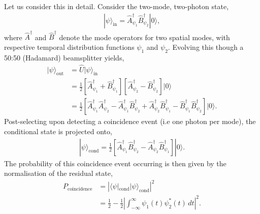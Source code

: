 \documentclass[aps,rmp,twocolumn,amsmath,amssymb,nofootinbib,superscriptaddress,longbibliography,floatfix,table-of-contents,eqsecnum]{revtex4-1}
\newcommand{\bra}[1]{\langle#1|}
\newcommand{\ket}[1]{|#1\rangle}
\begin{document}
Let us consider this in detail. Consider the two-mode, two-photon state,
\begin{align}
\ket\psi_\text{in} = \hat{A}^\dag_{\psi_1} \hat{B}^\dag_{\psi_2} \ket{0},
\end{align}
where $\hat{A}^\dag$ and $\hat{B}^\dag$ denote the mode operators for two spatial modes, with respective temporal distribution functions $\psi_1$ and $\psi_2$. Evolving this though a 50:50 (Hadamard) beamsplitter yields,
\begin{align}
\ket\psi_\text{out} &= \hat{U} \ket\psi_\text{in} \\
&= \frac{1}{2} \left[\hat{A}^\dag_{\psi_1}+\hat{B}^\dag_{\psi_1}\right]\left[\hat{A}^\dag_{\psi_2}-\hat{B}^\dag_{\psi_2}\right] \ket{0} \nonumber \\
&= \frac{1}{2} \left[\hat{A}^\dag_{\psi_1}\hat{A}^\dag_{\psi_2} - \hat{A}^\dag_{\psi_1}\hat{B}^\dag_{\psi_2} + \hat{A}^\dag_{\psi_2}\hat{B}^\dag_{\psi_1} - \hat{B}^\dag_{\psi_1}\hat{B}^\dag_{\psi_2}\right] \ket{0} \nonumber.
\end{align}
Post-selecting upon detecting a coincidence event (i.e one photon per mode), the conditional state is projected onto,
\begin{align}
\ket\psi_\text{cond} = \frac{1}{2} \left[\hat{A}^\dag_{\psi_1}\hat{B}^\dag_{\psi_2} - \hat{A}^\dag_{\psi_2}\hat{B}^\dag_{\psi_1}\right] \ket{0}.
\end{align}
The probability of this coincidence event occurring is then given by the normalisation of the residual state,
\begin{align}
P_\text{coincidence} &= \left| \bra\psi_\text{cond} \ket\psi_\text{cond} \right|^2 \nonumber \\
&= \frac{1}{2} - \frac{1}{2} \left| \int^\infty_{-\infty} \psi_1(t)\psi_2^*(t)\,dt\right|^2.
\end{align}
\end{document}

